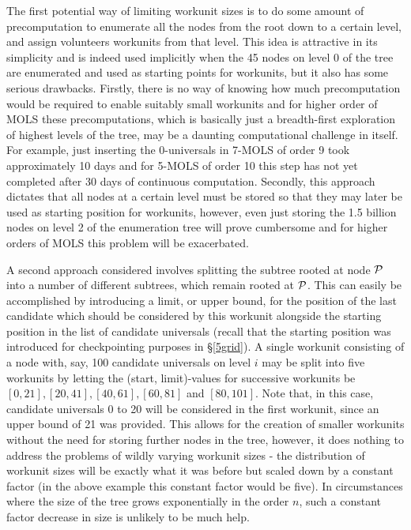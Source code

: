 The first potential way of limiting workunit sizes is to do some amount of precomputation to enumerate all the nodes from the root down to a certain level, and assign volunteers workunits from that level. 
This idea is attractive in its simplicity and is indeed used implicitly when the 45 nodes on level 0 of the tree are enumerated and used as starting points for workunits, but it also has some serious drawbacks. 
Firstly, there is no way of knowing how much precomputation would be required to enable suitably small workunits and for higher order of MOLS these precomputations, which is basically just a breadth-first exploration of highest levels of the tree, may be a daunting computational challenge in itself. For example, just inserting the 0-universals in 7-MOLS of order 9 took approximately 10 days and for 5-MOLS of order 10 this step has not yet completed after 30 days of continuous computation. 
Secondly, this approach dictates that all nodes at a certain level must be stored so that they may later be used as starting position for workunits, however, even just storing the 1.5 billion nodes on level 2 of the enumeration tree will prove cumbersome and for higher orders of MOLS this problem will be exacerbated. %

A second approach considered involves splitting the subtree rooted at node $\mathcal{P}$ into a number of different subtrees, which remain rooted at $\mathcal{P}$. This can easily be accomplished by introducing a limit, or upper bound, for the position of the last candidate which should be considered by this workunit alongside the starting position in the list of candidate universals (recall that the starting position was introduced for checkpointing purposes in \S\ref{5grid}). A single workunit consisting of a node with, say, 100 candidate universals on level $i$ may be split into five workunits by letting the (start, limit)-values for successive workunits be $[0,21], [20,41], [40, 61], [60, 81]$ and $[80,101]$. Note that, in this case, candidate universals 0 to 20 will be considered in the first workunit, since an upper bound of 21 was provided. This allows for the creation of smaller workunits without the need for storing further nodes in  the tree, however, it does nothing to address the problems of wildly varying workunit sizes - the distribution of workunit sizes will be exactly what it was before but scaled down by a constant factor (in the above example this constant factor would be five). In circumstances where the size of the tree grows exponentially in the order $n$, such a constant factor decrease in size is unlikely to be much help.

